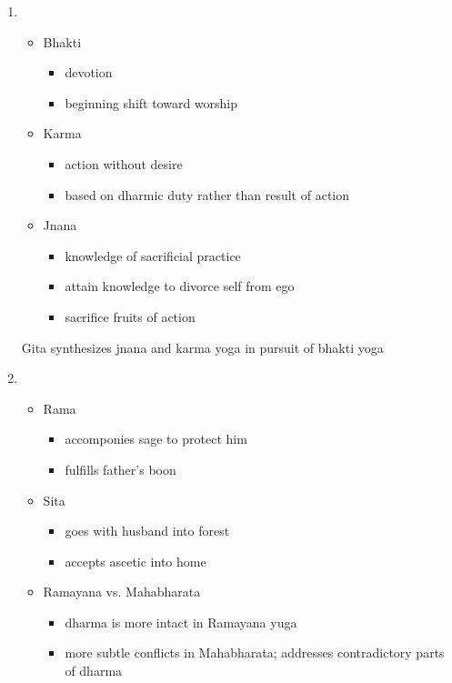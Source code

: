 \documentclass[11pt]{article} %
\begin{document}
\begin{enumerate}
\item
\begin{itemize}
	\item Bhakti
	\begin{itemize}
		\item devotion
		\item beginning shift toward worship
	\end{itemize}
	\item Karma
	\begin{itemize}
		\item action without desire
		\item based on dharmic duty rather than result of action
	\end{itemize}
		\item Jnana
	\begin{itemize}
		\item knowledge of sacrificial practice
		\item attain knowledge to divorce self from ego
		\item sacrifice fruits of action
	\end{itemize}
\end{itemize}
Gita synthesizes jnana and karma yoga in pursuit of bhakti yoga

\item
\begin{itemize}
	\item Rama
	\begin{itemize}
		\item accomponies sage to protect him
		\item fulfills father's boon
	\end{itemize}
	\item Sita
	\begin{itemize}
		\item goes with husband into forest
		\item accepts ascetic into home
	\end{itemize}
	\item Ramayana vs. Mahabharata
	\begin{itemize}
		\item dharma is more intact in Ramayana yuga
		\item more subtle conflicts in Mahabharata; addresses 						                 contradictory parts of dharma
	\end{itemize}
\end{itemize}

\end{enumerate}
\end{document}
